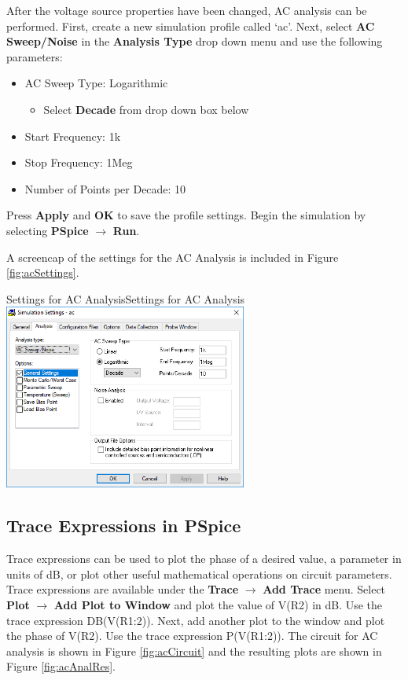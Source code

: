 \documentclass[12pt]{../manual}
\begin{document}
After the voltage source properties have been changed, AC analysis can be performed. First, create a new simulation profile called `ac'. Next, select \textbf{AC Sweep/Noise} in the \textbf{Analysis Type} drop down menu and use the following parameters:
\begin{itemize}
\item AC Sweep Type: Logarithmic 
\begin{itemize}
\item Select \textbf{Decade} from drop down box below
\end{itemize}
\item Start Frequency: 1k
\item Stop Frequency: 1Meg
\item Number of Points per Decade: 10
\end{itemize}
Press \textbf{Apply} and \textbf{OK} to save the profile settings. Begin the simulation by selecting \textbf{PSpice} $\to$ \textbf{Run}.

A screencap of the settings for the AC Analysis is included in Figure \ref{fig:acSettings}.

\begin{myfigure}[label=fig:acSettings]{Settings for AC Analysis}{Settings for AC Analysis}
\centering
\includegraphics[width=0.6\textwidth]{figures/ACAnalysisSettings.PNG}
\end{myfigure}

\subsection*{Trace Expressions in PSpice}
Trace expressions can be used to plot the phase of a desired value, a parameter in units of dB, or plot other useful mathematical operations on circuit parameters. Trace expressions are available under the \textbf{Trace} $\to$ \textbf{Add Trace} menu. Select \textbf{Plot} $\to$ \textbf{Add Plot to Window} and plot the value of V(R2) in dB. Use the trace expression DB(V(R1:2)). Next, add another plot to the window and plot the phase of V(R2). Use the trace expression P(V(R1:2)). The circuit for AC analysis is shown in Figure \ref{fig:acCircuit} and the resulting plots are shown in Figure \ref{fig:acAnalRes}.
\end{document}
